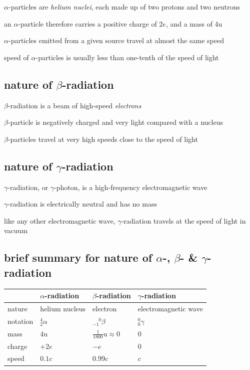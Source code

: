 $\alpha$-particles are \emph{helium nuclei}, each made up of two protons and two neutrons

an $\alpha$-particle therefore carries a positive charge of 2$e$, and a mass of 4u

$\alpha$-particles emitted from a given source travel at almost the same speed

speed of $\alpha$-particles is usually less than one-tenth of the speed of light

\subsection*{nature of \texorpdfstring{$\beta$}{\textbeta}-radiation}


$\beta$-radiation is a beam of high-speed \emph{electrons}

$\beta$-particle is negatively charged and very light compared with a nucleus

$\beta$-particles travel at very high speeds close to the speed of light

\subsection*{nature of \texorpdfstring{$\gamma$}{\textgamma}-radiation}

$\gamma$-radiation, or $\gamma$-photon, is a high-frequency electromagnetic wave

$\gamma$-radiation is electrically neutral and has no mass

like any other electromagnetic wave, $\gamma$-radiation travels at the speed of light in vacuum

\subsection*{brief summary for nature of \texorpdfstring{$\alpha$}{\textalpha}-, \texorpdfstring{$\beta$}{\textbeta}- \& \texorpdfstring{$\gamma$}{\textgamma}-radiation}



\begin{center}
	{\renewcommand{\arraystretch}{1.2}
	\begin{tabular}{|C{2cm}|C{2.8cm}|C{2.8cm}|C{4.2cm}|}
	\hline  & $\alpha$-radiation & $\beta$-radiation & $\gamma$-radiation \\ 
	\hline nature & helium nucleus & electron & electromagnetic wave \\ 
	\hline notation & $^4_2\alpha$ & $^{\phantom{-}0}_{-1}\beta$ & $^0_0\gamma$ \\
	\hline mass & 4u & $\frac{1}{1800}\text{u} \approx 0$ & 0 \\[4pt]
	\hline charge & $+2e$ & $-e$ & 0 \\ 
	\hline speed & $0.1c$ & $0.99c$ & $c$ \\
	\hline
    \end{tabular}
    }
\end{center}


